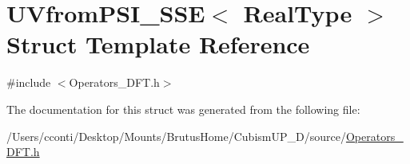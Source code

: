 \hypertarget{struct_u_vfrom_p_s_i___s_s_e}{}\section{U\+Vfrom\+P\+S\+I\+\_\+\+S\+S\+E$<$ Real\+Type $>$ Struct Template Reference}
\label{struct_u_vfrom_p_s_i___s_s_e}


{\ttfamily \#include $<$Operators\+\_\+\+D\+F\+T.\+h$>$}



The documentation for this struct was generated from the following file\+:\begin{DoxyCompactItemize}
\item 
/\+Users/cconti/\+Desktop/\+Mounts/\+Brutus\+Home/\+Cubism\+U\+P\+\_\+D/source/\hyperlink{_operators___d_f_t_8h}{Operators\+\_\+\+D\+F\+T.\+h}\end{DoxyCompactItemize}
